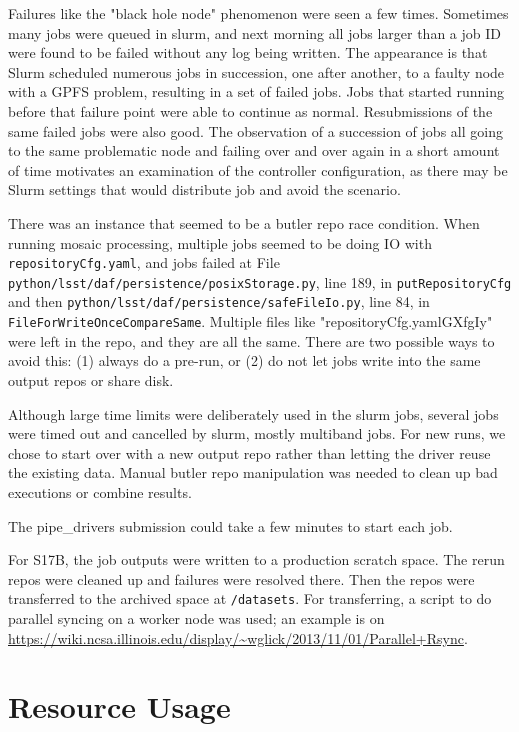 \documentclass[DM,authoryear,toc]{lsstdoc}
\begin{document}
Failures like the "black hole node" phenomenon were seen a few times. Sometimes many jobs were queued in slurm, and next morning all jobs larger than a job ID were found to be failed without any log being written.  The appearance is that Slurm scheduled numerous jobs in succession, one after another, to a faulty node with a GPFS problem, resulting in a set of failed jobs.   Jobs that started running before that failure point were able to continue as normal. Resubmissions of the same failed jobs were also good.   The observation of a succession of jobs all going to the same problematic node and failing over and over again in a short amount of time motivates an examination of the controller configuration, as there may be Slurm settings that would distribute job and avoid the scenario.

There was an instance that seemed to be a butler repo race condition. When running mosaic processing, multiple jobs seemed to be doing IO with \texttt{repositoryCfg.yaml}, and jobs failed at File \texttt{python/lsst/daf/persistence/posixStorage.py}, line 189, in \texttt{putRepositoryCfg} and then \texttt{python/lsst/daf/persistence/safeFileIo.py}, line 84, in \texttt{FileForWriteOnceCompareSame}. Multiple files like "repositoryCfg.yamlGXfgIy" were left in the repo, and they are all the same.  There are two possible ways to avoid this: (1) always do a pre-run, or (2) do not let jobs write into the same output repos or share disk.

Although large time limits were deliberately used in the slurm jobs, several jobs were timed out and cancelled by slurm, mostly multiband jobs. For new runs, we chose to start over with a new output repo rather than letting the driver reuse the existing data. Manual butler repo manipulation was needed to clean up bad executions or combine results.

The pipe{\_}drivers submission could take a few minutes to start each job.

For S17B, the job outputs were written to a production scratch space.  The rerun repos were cleaned up and failures were resolved there. Then the repos were transferred to the archived space at \texttt{/datasets}.  For transferring, a script to do parallel syncing on a worker node was used; an example is on \url{https://wiki.ncsa.illinois.edu/display/~wglick/2013/11/01/Parallel+Rsync}.


\section{Resource Usage}
\end{document}

